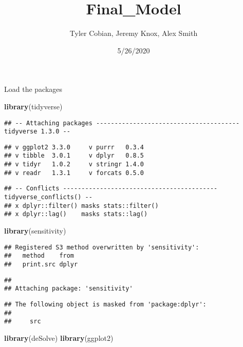\documentclass[]{article}
\title{Final\_Model}
\author{Tyler Cobian, Jeremy Knox, Alex Smith}
\date{5/26/2020}
\newenvironment{Shaded}{\begin{snugshade}}{\end{snugshade}}
\newcommand{\KeywordTok}[1]{\textcolor[rgb]{0.13,0.29,0.53}{\textbf{#1}}}
\newcommand{\NormalTok}[1]{#1}
\begin{document}
\maketitle

Load the packages

\begin{Shaded}
\begin{Highlighting}[]
\KeywordTok{library}\NormalTok{(tidyverse)}
\end{Highlighting}
\end{Shaded}

\begin{verbatim}
## -- Attaching packages --------------------------------------- tidyverse 1.3.0 --
\end{verbatim}

\begin{verbatim}
## v ggplot2 3.3.0     v purrr   0.3.4
## v tibble  3.0.1     v dplyr   0.8.5
## v tidyr   1.0.2     v stringr 1.4.0
## v readr   1.3.1     v forcats 0.5.0
\end{verbatim}

\begin{verbatim}
## -- Conflicts ------------------------------------------ tidyverse_conflicts() --
## x dplyr::filter() masks stats::filter()
## x dplyr::lag()    masks stats::lag()
\end{verbatim}

\begin{Shaded}
\begin{Highlighting}[]
\KeywordTok{library}\NormalTok{(sensitivity)}
\end{Highlighting}
\end{Shaded}

\begin{verbatim}
## Registered S3 method overwritten by 'sensitivity':
##   method    from 
##   print.src dplyr
\end{verbatim}

\begin{verbatim}
## 
## Attaching package: 'sensitivity'
\end{verbatim}

\begin{verbatim}
## The following object is masked from 'package:dplyr':
## 
##     src
\end{verbatim}

\begin{Shaded}
\begin{Highlighting}[]
\KeywordTok{library}\NormalTok{(deSolve)}
\KeywordTok{library}\NormalTok{(ggplot2)}
\end{Highlighting}
\end{Shaded}
\end{document}
